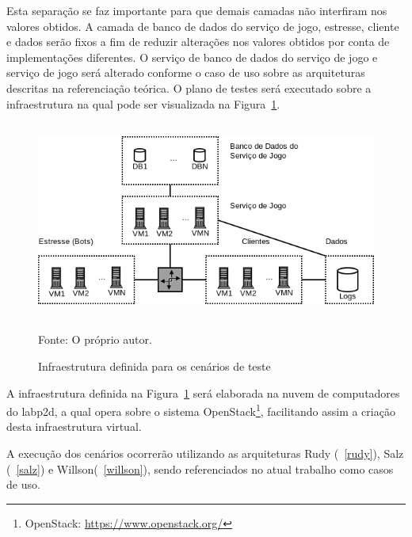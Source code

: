 Esta separação se faz importante para que demais camadas não interfiram nos valores obtidos.
%
A camada de banco de dados do serviço de jogo, estresse, cliente e dados serão fixos a fim de reduzir alterações nos valores obtidos por conta de implementações diferentes.
%
O serviço de banco de dados do serviço de jogo e serviço de jogo será alterado conforme o caso de uso sobre as arquiteturas descritas na referenciação teórica.
%
O plano de testes será executado sobre a infraestrutura na qual pode ser visualizada na Figura~\ref{infraestrutura}.

\begin{figure}[htb!]
  \caption{Infraestrutura definida para os cenários de teste}
  \label{infraestrutura}
  \includegraphics[height=6.5cm]{img/cap3/infraestrutura.png}
  \centering

  Fonte: O próprio autor.
\end{figure}

A infraestrutura definida na Figura~\ref{infraestrutura} será elaborada na nuvem de computadores do \ac{labp2d}, a qual opera sobre o sistema OpenStack\footnote{OpenStack: \url{https://www.openstack.org/}}, facilitando assim a criação desta infraestrutura virtual.

A execução dos cenários ocorrerão utilizando as arquiteturas Rudy (~\ref{rudy}), Salz (~\ref{salz}) e Willson(~\ref{willson}), sendo referenciados no atual trabalho como casos de uso.
%


% 
